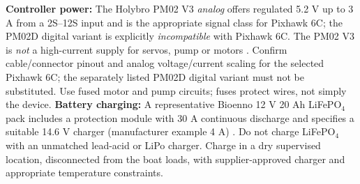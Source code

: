 \documentclass[10pt,a4paper]{article}
\begin{document}
\textbf{Controller power:} The Holybro PM02 V3 \emph{analog} offers regulated 5.2 V up to 3 A from a 2S--12S input and is the appropriate signal class for Pixhawk 6C; the PM02D digital variant is explicitly \emph{incompatible} with Pixhawk 6C. The PM02 V3 is \emph{not} a high-current supply for servos, pump or motors \cite{PM02D}. Confirm cable/connector pinout and analog voltage/current scaling for the selected Pixhawk 6C; the separately listed PM02D digital variant must not be substituted. Use fused motor and pump circuits; fuses protect wires, not simply the device. \textbf{Battery charging:} A representative Bioenno 12 V 20 Ah LiFePO$_4$ pack includes a protection module with 30 A continuous discharge and specifies a suitable 14.6 V charger (manufacturer example 4 A) \cite{Bioenno}. Do not charge LiFePO$_4$ with an unmatched lead-acid or LiPo charger. Charge in a dry supervised location, disconnected from the boat loads, with supplier-approved charger and appropriate temperature constraints.
\end{document}
